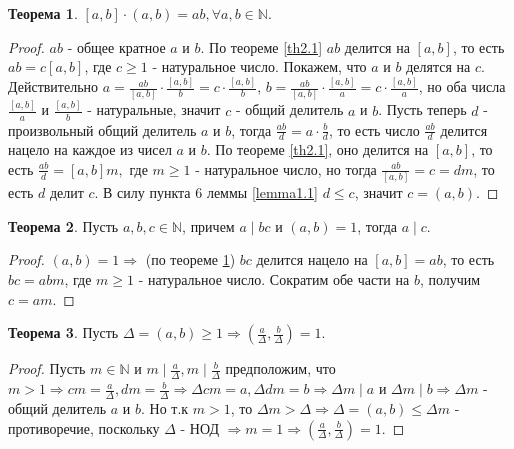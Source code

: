 \documentclass[a4paper, 12pt]{article}
\newcommand{\N}{\mathbb{N}}
\renewcommand{\div}{\mid}
\theoremstyle{definition}
\newtheorem{theorem}{Теорема}[section]
\begin{document}
    \begin{theorem} \label{th2.2}
        $[a,b]\cdot (a,b)=ab, \forall a,b \in \mathbb{N}$.
    \end{theorem}
    \begin{proof}
        $ab$ - общее кратное $a$ и $b$. По теореме \ref{th2.1} $ab$ делится на $[a,b]$, то есть $ab=c[a,b]$, где $c\geq 1$ - натуральное число. Покажем, что $a$ и $b$ делятся на $c$. Действительно $a=\frac{ab}{[a,b]}\cdot \frac{[a,b]}{b}=c\cdot \frac{[a,b]}{b}$, $b=\frac{ab}{[a,b]}\cdot \frac{[a,b]}{a}=c\cdot \frac{[a,b]}{a}$, но оба числа $\frac{[a,b]}{a}$ и $\frac{[a,b]}{b}$ - натуральные, значит $c$ - общий делитель $a$ и $b$. Пусть теперь $d$ - произвольный общий делитель $a$ и $b$, тогда $\frac{ab}{d}=a\cdot \frac{b}{d}$, то есть число $\frac{ab}{d}$ делится нацело на каждое из чисел $a$ и $b$. По теореме \ref{th2.1}, оно делится на $[a,b]$, то есть $\frac{ab}{d}=[a,b]m, $ где $ m\geq 1$ - натуральное число, но тогда $\frac{ab}{[a,b]}=c=dm$, то есть $d$ делит $c$. В силу пункта 6 леммы \ref{lemma1.1} $d\leq c$, значит $c=(a,b)$.
    \end{proof}
    \begin{theorem} \label{th2.3}
        Пусть $a,b,c \in \mathbb{N}$, причем $a \div bc$ и $(a,b)=1$, тогда $a \div c$. 
    \end{theorem}
    \begin{proof}
        $(a,b)=1 \Rightarrow$ (по теореме \ref{th2.2}) $bc$ делится нацело на $[a,b]=ab$, то есть $bc=abm$, где $m\geq 1$ - натуральное число. Сократим обе части на $b$, получим $c=am$. 
    \end{proof}
    \begin{theorem} \label{th2.4}
        Пусть $\Delta=(a,b)\geq 1 \Rightarrow (\frac{a}{\Delta}, \frac{b}{\Delta})=1$.
    \end{theorem} 
    \begin{proof}
        Пусть $m\in \N$ и $m \mid \frac{a}{\Delta}, m \mid \frac{b}{\Delta}$ предположим, что $m > 1 \Rightarrow cm=\frac{a}{\Delta},dm=\frac{b}{\Delta}\Rightarrow \Delta cm=a, \Delta dm=b \Rightarrow \Delta m \mid a$ и $\Delta m\mid b\Rightarrow \Delta m$ - общий делитель $a$ и $b$. Но т.к $m>1$, то $\Delta m>\Delta \Rightarrow \Delta=(a,b) \leq \Delta m$ - противоречие, поскольку $\Delta$ - НОД $\Rightarrow m=1\Rightarrow (\frac{a}{\Delta}, \frac{b}{\Delta})=1$.
    \end{proof} 
\end{document}
